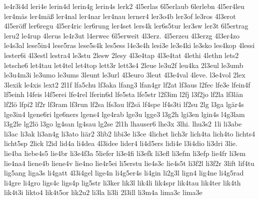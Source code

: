 {    le4r3i4d
    leri4e
    lerin4d
    lerin4g
    lerin4s
    lerk2
    4l5erlas
    6l5erlaub
    6lerlebn
    4l5er4leu
    ler4mäs
    ler4mäß
    ler4nal
    ler4nar
    ler4nau
    lerner4
    ler3o4b
    ler3of
    le3ros
    4l3erot
    4l5eröff
    ler6regu
    4l5er4ric
    ler6rung
    ler4set
    lers4k
    ler6s5tur
    ler3sw
    ler3t
    6l5ertrag
    leru2
    le4rup
    4lerus
    le4r3ut
    l4erwec
    6l5erweit
    4l3erz.
    4l5erzeu
    4l3erzg
    4l3er4zo
    le4s3al
    lese5in4
    lese5ras
    lese5s4k
    les5ess
    l4e3s4h
    lesi3e
    le3s4ki
    le3sko
    les4kop
    4lessi
    lester6i
    4l3estl
    lestra4
    le3stu
    2lesw
    2lesy
    4l3e4tap
    4l3e4tat
    4lethi
    4lethn
    lets2
    letsche6
    let4tau
    let4tel
    let4top
    lett3r
    lett3s4
    2leue
    le3u2f
    leu4ka
    2l3eul
    le3umb
    le3u4m3i
    le3umo
    le3ums
    3leunt
    le3url
    4l3euro
    3leut
    4l3e4val
    4leve.
    l3e4vol
    2lex
    3lexik
    le4xis
    lext2
    2l1f
    lfa5chu
    lf3aka
    lfang3
    lfan4gr
    lf2at
    lf3aus
    l2fec
    lfe3e
    lfein4f
    lf5einh
    l4feis
    l4f5erei
    lfe4rel
    lferin6d
    lfe5sta
    lfe5str
    l2f3im
    l2fj
    l3f2jo
    lf2la
    lf3län
    lf2lö
    lfpi2
    lf2r
    lf3ram
    lf3run
    lf2sa
    lfs3au
    lf2sä
    lf4spe
    lf4s3ti
    lf2su
    2lg
    l3ga
    lgär4s
    lge3in4
    lgene6ri
    lge6ners
    lgens4
    lge4rab
    lge3u
    lgge3
    l3g2h
    lgi3en
    lgin4s
    l4g3lam
    l3g2le
    lg2lö
    l3go
    lg4san
    lg4sau
    lg2se
    2l1h
    lhauser6
    lhe3x
    3lhi.
    lhu3s2
    1li
    li3abe
    li3ac
    li3ak
    li3an4g
    li3ato
    liär2
    3lib2
    libi3e
    li3ce
    4lichet
    lich3r
    lich4ta
    lich4to
    lichts4
    licht5sp
    2lick
    l2id
    lid4a
    li4dea
    4l3idee
    lider4
    li4d5ers
    lidi4e
    l3i4dio
    li3dri
    3lie.
    lie4ba
    liebe4s5
    lie4br
    li3e4f3a
    5liefer
    li3e4fi
    li3efk
    li3efl
    li3efm
    li3efp
    lie4fr
    li3em
    lie4na4
    liene4b
    liene4v
    lie4no
    lie4r5ei
    li5erstu
    lie4s3c
    lie4s5t
    li3f2l
    li3f2r
    3lift
    lif4tu
    lig5ang
    liga3s
    li4gatt
    4l3i4gel
    lige4n
    li4g5er4s
    li4gin
    li2g3l
    lign4
    lig4ne
    li4g5rad
    li4gre
    li4gro
    ligs4c
    ligs4p
    lig5str
    li3ker
    lik3l
    lik4li
    lik4spr
    lik4tau
    lik4ter
    lik4th
    lik4t3i
    likto4
    lik4t5or
    lik2u2
    li3la
    li3li
    2l3ill
    li3m4a
    lima3c
    lima3e
}
